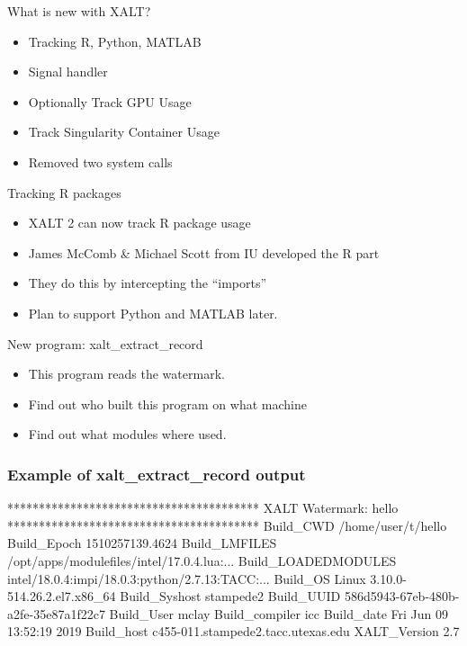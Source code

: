 \documentclass{beamer}
\begin{document}
\begin{frame}{What is new with XALT?}
  \begin{itemize}
    \item Tracking R, Python, MATLAB
    \item Signal handler
    \item Optionally Track GPU Usage
    \item Track Singularity Container Usage
    \item Removed two system calls
  \end{itemize}
\end{frame}

\begin{frame}{Tracking R packages}
  \begin{itemize}
    \item XALT 2 can now track R package usage
    \item James McComb \& Michael Scott from IU developed the R part
    \item They do this by intercepting the ``imports''
    \item Plan to support Python and MATLAB later.
  \end{itemize}
\end{frame}

\begin{frame}{New program: xalt\_extract\_record}
  \begin{itemize}
    \item This program reads the watermark.
    \item Find out who built this program on what machine
    \item Find out what modules where used.
  \end{itemize}
\end{frame}

\begin{frame}[fragile]
    \frametitle{Example of xalt\_extract\_record output}
 {\small
    \begin{semiverbatim}
****************************************
XALT Watermark: hello
****************************************
Build\_CWD                /home/user/t/hello
Build\_Epoch              1510257139.4624
Build\_LMFILES            /opt/apps/modulefiles/intel/17.0.4.lua:...
Build\_LOADEDMODULES      intel/18.0.4:impi/18.0.3:python/2.7.13:TACC:...
Build\_OS                 Linux 3.10.0-514.26.2.el7.x86_64
Build\_Syshost            stampede2
Build\_UUID               586d5943-67eb-480b-a2fe-35e87a1f22c7
Build\_User               mclay
Build\_compiler           icc
Build\_date               Fri Jun 09 13:52:19 2019
Build\_host               c455-011.stampede2.tacc.utexas.edu
XALT\_Version             2.7
    \end{semiverbatim}
}
\end{frame}
\end{document}
